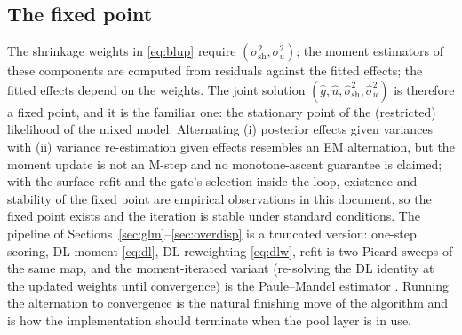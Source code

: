 \documentclass[11pt]{article}
\begin{document}
\subsection{The fixed point}
The shrinkage weights in \eqref{eq:blup} require $(\sigma_{\mathrm{sh}}^2,\sigma_u^2)$;
the moment estimators of these components are computed from residuals against the
fitted effects; the fitted effects depend on the weights. The joint solution
$(\hat g,\hat u,\hat\sigma_{\mathrm{sh}}^2,\hat\sigma_u^2)$ is therefore a fixed point,
and it is the familiar one: the stationary point of the (restricted) likelihood of the
mixed model. Alternating (i) posterior effects given variances with (ii) variance
re-estimation given effects resembles an EM alternation, but the moment update is not an M-step and no monotone-ascent guarantee is claimed; with the surface refit and the gate's selection inside the loop, existence and stability of the fixed point are empirical observations in this document,
so the fixed point exists and the iteration is stable under standard conditions.
The pipeline of Sections~\ref{sec:glm}--\ref{sec:overdisp} is a truncated version:
one-step scoring, DL moment \eqref{eq:dl}, DL reweighting \eqref{eq:dlw}, refit is two
Picard sweeps of the same map, and the moment-iterated variant (re-solving the DL
identity at the updated weights until convergence) is the Paule--Mandel estimator
\cite{paule1982}. Running the alternation to convergence is the natural finishing move
of the algorithm and is how the implementation should terminate when the pool layer is
in use.
\end{document}
